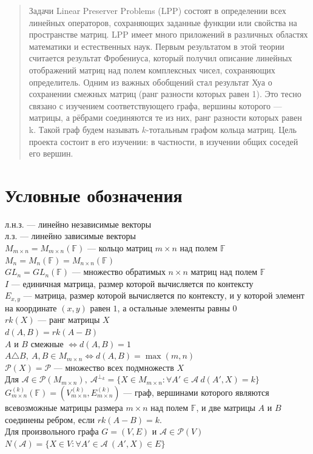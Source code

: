 \documentclass{article}
\begin{document}
\makeTitlePage

\tableofcontents

\begin{abstract}
Задачи Linear Preserver Problems (LPP) состоят в определении всех линейных операторов, сохраняющих заданные функции или свойства на пространстве матриц. LPP имеет много приложений в различных областях математики и естественных наук. Первым результатом в этой теории считается результат Фробениуса, который получил описание линейных отображений матриц над полем комплексных чисел, сохраняющих определитель. Одним из важных обобщений стал результат Хуа о сохранении смежных матриц (ранг разности которых равен 1). Это тесно связано с изучением соответствующего графа, вершины которого — матрицы, а рёбрами соединяются те из них, ранг разности которых равен k. Такой граф будем называть $k$-тотальным графом кольца матриц. Цель проекта состоит в его изучении: в частности, в изучении общих соседей его вершин.
\end{abstract}
\section{Условные обозначения}
л.н.з. — линейно независимые векторы\\
л.з. — линейно зависимые векторы\\
$M_{m \times n} = M_{m \times n}(\mathbb{F})$ — кольцо матриц $m \times n$ над полем $\mathbb{F}$\\
$M_n = M_n(\mathbb{F}) = M_{n \times n}(\mathbb{F})$\\
$GL_n = GL_n(\mathbb{F})$ — множество обратимых $n \times n$ матриц над полем $\mathbb{F}$\\
$I$ — единичная матрица, размер которой вычисляется по контексту \\
$E_{x, y}$ — матрица, размер которой вычисляется по контексту, и у которой элемент на координате $(x, y)$ равен $1$, а остальные элементы равны $0$\\
$rk(X)$ — ранг матрицы $X$\\
$d(A, B) = rk(A - B)$\\
$A$ и $B$ смежные $\iff d(A, B) = 1$\\
$A \triangle B, \ A, B \in M_{m \times n} \iff d(A, B) = \max(m, n)$\\
$\mathcal{P}(X) = \mathcal P$ — множество всех подмножеств $X$\\
Для $\mathcal{A} \in \mathcal P (M_{m \times n}), \ \mathcal{A}^{\perp_k} = \{X \in M_{m \times n} : \forall A' \in \mathcal{A} \ d(A', X) = k\}$\\
$G_{m \times n}^{(k)}(\mathbb{F}) = (V_{m \times n}^{(k)}, E_{m \times n}^{(k)})$ — граф, вершинами которого являются всевозможные матрицы размера $m \times n$ над полем $\mathbb{F}$, и две матрицы $A$ и $B$ соединены ребром, если $rk(A - B) = k$. \\
Для произвольного графа $G = (V, E)$ и $\mathcal{A} \in \mathcal{P}(V)$\\ $N(\mathcal{A}) = \{X \in V : \forall A' \in \mathcal{A} \ (A', X) \in E \}$
\end{document}
